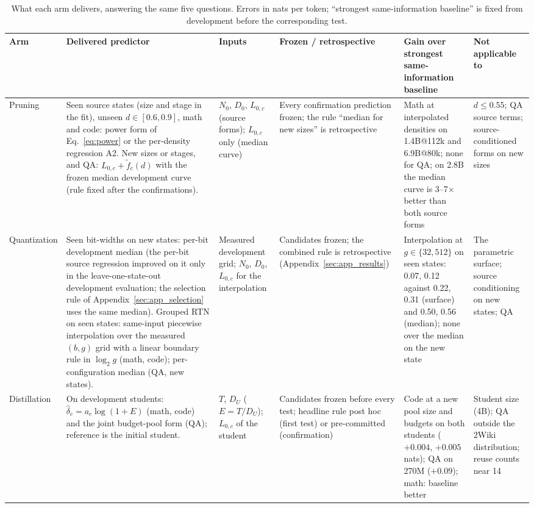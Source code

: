 \begin{table}[H]
\centering\scriptsize\setlength{\tabcolsep}{3pt}\renewcommand{\arraystretch}{1.05}
\begin{tabular}{@{}>{\raggedright\arraybackslash}p{1.35cm}>{\raggedright\arraybackslash}p{3.2cm}>{\raggedright\arraybackslash}p{2.3cm}>{\raggedright\arraybackslash}p{2.6cm}>{\raggedright\arraybackslash}p{2.7cm}>{\raggedright\arraybackslash}p{2.35cm}@{}}
\toprule
Arm & Delivered predictor & Inputs & Frozen / retrospective & Gain over strongest same-information baseline & Not applicable to \\
\midrule
Pruning & Seen source states (size and stage in the fit), unseen $d\in[0.6,0.9]$, math and code: power form of Eq.~\ref{eq:power} or the per-density regression A2. New sizes or stages, and QA: $L_{0,c}+\widetilde f_c(d)$ with the frozen median development curve (rule fixed after the confirmations). & $N_0$, $D_0$, $L_{0,c}$ (source forms); $L_{0,c}$ only (median curve) & Every confirmation prediction frozen; the rule ``median for new sizes'' is retrospective & Math at interpolated densities on 1.4B@112k and 6.9B@80k; none for QA; on 2.8B the median curve is 3--7$\times$ better than both source forms & $d\le0.55$; QA source terms; source-conditioned forms on new sizes \\
\addlinespace
Quantization & Seen bit-widths on new states: per-bit development median (the per-bit source regression improved on it only in the leave-one-state-out development evaluation; the selection rule of Appendix~\ref{sec:app_selection} uses the same median). Grouped RTN on seen states: same-input piecewise interpolation over the measured $(b,g)$ grid with a linear boundary rule in $\log_2 g$ (math, code); per-configuration median (QA, new states). & Measured development grid; $N_0$, $D_0$, $L_{0,c}$ for the interpolation & Candidates frozen; the combined rule is retrospective (Appendix~\ref{sec:app_results}) & Interpolation at $g\in\{32,512\}$ on seen states: 0.07, 0.12 against 0.22, 0.31 (surface) and 0.50, 0.56 (median); none over the median on the new state & The parametric surface; source conditioning on new states; QA \\
\addlinespace
Distillation & On development students: $\widehat\delta_c=a_c\log(1+E)$ (math, code) and the joint budget-pool form (QA); reference is the initial student. & $T$, $D_U$ ($E=T/D_U$); $L_{0,c}$ of the student & Candidates frozen before every test; headline rule post hoc (first test) or pre-committed (confirmation) & Code at a new pool size and budgets on both students ($+0.004$, $+0.005$ nats); QA on 270M ($+0.09$); math: baseline better & Student size (4B); QA outside the 2Wiki distribution; reuse counts near 14 \\
\bottomrule
\end{tabular}
\caption{What each arm delivers, answering the same five questions. Errors in nats per token; ``strongest same-information baseline'' is fixed from development before the corresponding test.}
\label{tab:final}
\end{table}
